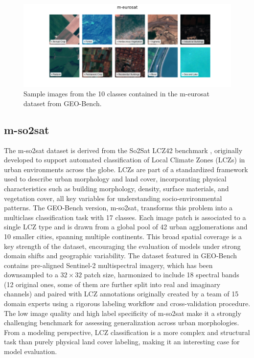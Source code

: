 \documentclass[a4paper, oneside, english]{sapthesis} %
\begin{document}
\begin{figure}[h]
    \centering
    \includegraphics[width=\textwidth]{img/m-eurosat_image_grid.png}
    \caption{\normalsize Sample images from the 10 classes contained in the m-eurosat dataset from GEO-Bench.}
    \label{fig:meurosatgrid}
\end{figure}


\subsection{m-so2sat}

The m-so2sat dataset is derived from the So2Sat LCZ42 benchmark \cite{zhu2019so2sat}, originally developed to support automated classification of Local Climate Zones (LCZs) in urban environments across the globe. LCZs are part of a standardized framework used to describe urban morphology and land cover, incorporating physical characteristics such as building morphology, density, surface materials, and vegetation cover, all key variables for understanding socio-environmental patterns.
The GEO-Bench version, m-so2sat, transforms this problem into a multiclass classification task with 17 classes. Each image patch is associated to a single LCZ type and is drawn from a global pool of 42 urban agglomerations and 10 smaller cities, spanning multiple continents. This broad spatial coverage is a key strength of the dataset, encouraging the evaluation of models under strong domain shifts and geographic variability.
The dataset featured in GEO-Bench contains pre-aligned Sentinel-2 multispectral imagery, which has been downsampled to a $32 \times 32$ patch size, harmonized to include 18 spectral bands (12 original ones, some of them are further split into real and imaginary channels) and paired with LCZ annotations originally created by a team of 15 domain experts using a rigorous labeling workflow and cross-validation procedure.
The low image quality and high label specificity of m-so2sat make it a strongly challenging benchmark for assessing generalization across urban morphologies. From a modeling perspective, LCZ classification is a more complex and structural task than purely physical land cover labeling, making it an interesting case for model evaluation.
\end{document}
